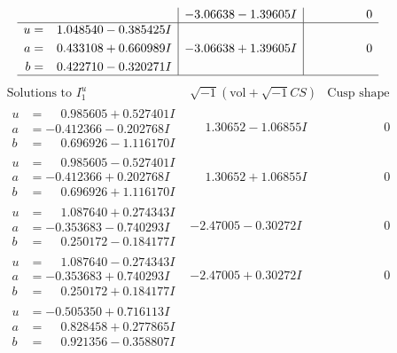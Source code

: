 \documentclass[1p]{elsarticle_modified}
\theoremstyle{definition}
\newcommand{\I}{\sqrt{-1}}
\begin{document}
$$\begin{array}{c|c|c}
 & -3.06638 - 1.39605 I & \phantom{-0.000000 } 0 \\ \hline\begin{aligned}
u &= \phantom{-}1.048540 - 0.385425 I \\
a &= \phantom{-}0.433108 + 0.660989 I \\
b &= \phantom{-}0.422710 - 0.320271 I\end{aligned}
 & -3.06638 + 1.39605 I & \phantom{-0.000000 } 0\\
 \hline 
 \end{array}$$\newpage$$\begin{array}{c|c|c}  
\text{Solutions to }I^u_{1}& \I (\text{vol} + \sqrt{-1}CS) & \text{Cusp shape}\\
 \hline 
\begin{aligned}
u &= \phantom{-}0.985605 + 0.527401 I \\
a &= -0.412366 - 0.202768 I \\
b &= \phantom{-}0.696926 - 1.116170 I\end{aligned}
 & \phantom{-}1.30652 - 1.06855 I & \phantom{-0.000000 } 0 \\ \hline\begin{aligned}
u &= \phantom{-}0.985605 - 0.527401 I \\
a &= -0.412366 + 0.202768 I \\
b &= \phantom{-}0.696926 + 1.116170 I\end{aligned}
 & \phantom{-}1.30652 + 1.06855 I & \phantom{-0.000000 } 0 \\ \hline\begin{aligned}
u &= \phantom{-}1.087640 + 0.274343 I \\
a &= -0.353683 - 0.740293 I \\
b &= \phantom{-}0.250172 - 0.184177 I\end{aligned}
 & -2.47005 - 0.30272 I & \phantom{-0.000000 } 0 \\ \hline\begin{aligned}
u &= \phantom{-}1.087640 - 0.274343 I \\
a &= -0.353683 + 0.740293 I \\
b &= \phantom{-}0.250172 + 0.184177 I\end{aligned}
 & -2.47005 + 0.30272 I & \phantom{-0.000000 } 0 \\ \hline\begin{aligned}
u &= -0.505350 + 0.716113 I \\
a &= \phantom{-}0.828458 + 0.277865 I \\
b &= \phantom{-}0.921356 - 0.358807 I\end{aligned}

\end{array}$$
\end{document}
